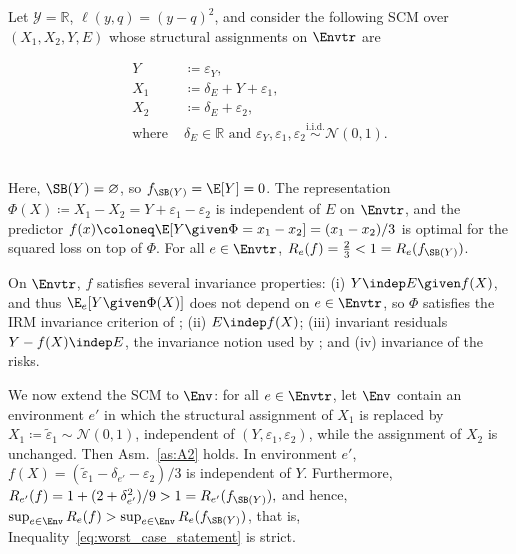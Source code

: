 \begin{example} \label{ex:strict-inequality}
Let $\mathcal{Y} = \mathbb{R}$, $\ell(y,q) = (y-q)^2$, and consider the following SCM over $(X_1, X_2, Y, E)$ whose structural assignments on $\Envtr$ are\\[0pt]
\begin{minipage}{0.49\textwidth}
\begin{align*}
    Y &\coloneq \varepsilon_Y, \\
    X_1 &\coloneq \delta_E + Y + \varepsilon_1, \\
    X_2 &\coloneq \delta_E + \varepsilon_2, \\
    \text{where }& \delta_E \in \mathbb{R} \text{ and } \varepsilon_Y, \varepsilon_1, \varepsilon_2 \stackrel{\text{i.i.d.}}{\sim} \mathcal{N}(0,1).
\end{align*}
\end{minipage}
\begin{minipage}{0.49\textwidth}
\centering
\vspace*{1.5em}

\end{minipage}\\[6pt]
Here, $\SB(Y) = \varnothing$, so $f_{\SB(Y)} = \E[Y] = 0$. The representation $\Phi(X) \coloneq X_1-X_2 = Y + \varepsilon_1 - \varepsilon_2$ is independent of $E$ on $\Envtr$, and the predictor $f(x) \coloneq \E[Y \given \Phi = x_1-x_2] = (x_1-x_2)/3$ is optimal for the squared loss on top of $\Phi$. For all $e \in \Envtr$, $R_e(f) = \frac{2}{3}< 1 = R_e(f_{\SB(Y)})$.



On $\Envtr$, $f$ satisfies several invariance properties: (i) $Y \indep E \given f(X)$, and thus $\E_e[Y \given \Phi(X)]$ does not depend on $e \in \Envtr$, so $\Phi$ satisfies the IRM invariance criterion of \citet[Def.~3]{arjovskyInvariantRiskMinimization2020}; (ii) $E \indep f(X)$; (iii) invariant residuals $Y - f(X) \indep E$, the invariance notion used by \citet{saengkyongamExploitingIndependentInstruments2022}; and (iv) invariance of the risks.

We now extend the SCM to $\Env$: for all $e\in\Envtr$, let $\Env$ contain an environment $e'$ in which the structural assignment of $X_1$ is replaced by $X_1\coloneq\tilde\varepsilon_1\sim\mathcal{N}(0,1)$, independent of $(Y,\varepsilon_1,\varepsilon_2)$, while the assignment of $X_2$ is unchanged. Then Asm.~\ref{as:A2} holds. In environment $e'$, $f(X)=(\tilde\varepsilon_1-\delta_{e'}-\varepsilon_2)/3$ is independent of $Y$. Furthermore, 
$R_{e'}(f) = 1 + (2 + \delta_{e'}^2)/9 > 1 = R_{e'}(f_{\SB(Y)}), $
and hence, $\sup_{e \in \Env}R_e(f) > \sup_{e\in\Env} R_e(f_{\SB(Y)})$, that is, Inequality~\eqref{eq:worst_case_statement} is strict. 
\end{example}

